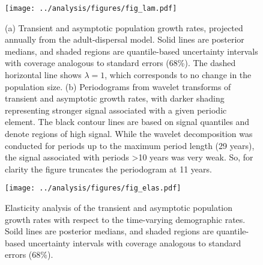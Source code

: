 \documentclass[11pt]{article}
\begin{document}
\clearpage
\begin{figure}
\centering
\texttt{[image: ../analysis/figures/fig\_lam.pdf]}
\caption{\label{fig:lam}
(a) Transient and asymptotic population growth rates,
projected annually from the adult-dispersal model.
Solid lines are posterior medians,
and shaded regions are quantile-based uncertainty intervals
with coverage analogous to standard errors (68\%).
The dashed horizontal line shows $\lambda=1$, 
which corresponds to no change in the population size.
(b) Periodograms from wavelet transforms of transient and asymptotic growth rates,
with darker shading representing stronger signal associated with a given periodic element.
The black contour lines are based on signal quantiles and denote regions of high signal.
While the wavelet decomposition was conducted for periods up to the maximum period length
(29 years), the signal associated with periods >10 years was very weak. 
So, for clarity the figure truncates the periodogram at 11 years.
}
\end{figure}
\clearpage

\clearpage
\begin{figure}
\centering
\texttt{[image: ../analysis/figures/fig\_elas.pdf]}
\caption{\label{fig:elas}
Elasticity analysis of the transient and asymptotic population growth rates 
with respect to the time-varying demographic rates.
Soild lines are posterior medians,
and shaded regions are quantile-based uncertainty intervals
with coverage analogous to standard errors (68\%).
}
\end{figure}
\clearpage





\renewcommand{\thefigure}{A\arabic{figure}}
\renewcommand{\theequation}{A\arabic{equation}}
\renewcommand{\thetable}{A\arabic{table}}
\setcounter{equation}{0}
\setcounter{figure}{0}
\setcounter{table}{0}
\end{document}
